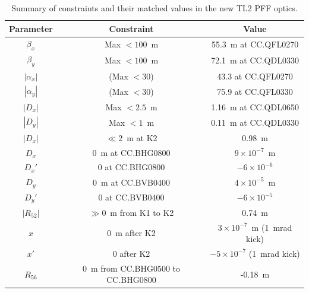 \begin{table}
  \begin{center}
    \begin{tabular}{|c c c|}
	   \hline
       Parameter & Constraint & Value \\ \hline
       \(\beta_x\) & Max \(<100\)~m & 55.3~m at CC.QFL0270\\
	   \(\beta_y\) & Max \(<100\)~m & 72.1~m at CC.QDL0330\\
	   \(|\alpha_x|\) & (Max \(<30\)) & 43.3 at CC.QFL0270\\
	   \(|\alpha_y|\) & (Max \(<30\)) & 75.9 at CC.QFL0330\\
	   \(|D_x|\) & Max \(<2.5\)~m & 1.16~m at CC.QDL0650\\
	   \(|D_y|\) & Max \(<1\)~m & 0.11~m at CC.QDL0330\\
	   \(|D_x|\) & \(\ll 2\)~m at K2 & 0.98~m\\
	   \(D_x\) & 0~m at CC.BHG0800 & \(9\times10^{-7}\)~m\\
	   \(D_x'\) & 0 at CC.BHG0800 & \(-6\times10^{-6}\)\\
	   \(D_y\) & 0~m at CC.BVB0400 & \(4\times10^{-5}\)~m\\
	   \(D_y'\) & 0 at CC.BVB0400 & \(-6\times10^{-5}\)\\
	   \(|R_{52}|\) & \(\gg 0\)~m from K1 to K2 & 0.74~m\\
	   \(x\) & 0~m after K2 & \(3\times10^{-7}\)~m (1~mrad kick)\\
	   \(x'\) & 0 after K2 & \(-5\times10^{-7}\) (1~mrad kick)\\
	   \(R_{56}\) & 0~m from CC.BHG0500 to CC.BHG0800 & -0.18~m\\
	   \hline
    \end{tabular}
    \caption{Summary of constraints and their matched values in the new TL2 PFF optics.}
  	\label{t:pffOpticsVals}
  \end{center}
\end{table}


